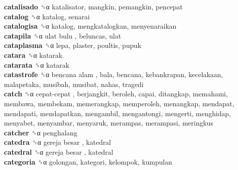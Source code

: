 \textbf{catalisado} ␝α  katalisator, mangkin, pemangkin, pencepat  \\
\textbf{catalog} ␝α  katalog, senarai  \\
\textbf{catalogisa} ␝α  katalog, mengkatalogkan, menyenaraikan  \\
\textbf{catapila} ␝α   ulat bulu , beluncas, ulat  \\
\textbf{cataplasma} ␝α  lepa, plaster, poultis, pupuk  \\
\textbf{catara} ␝α  katarak  \\
\textbf{catarata} ␝α  katarak  \\
\textbf{catastrofe} ␝α   bencana alam , bala, bencana, kebankrapan, kecelakaan, malapetaka, musibah, musibat, nahas, tragedi  \\
\textbf{catch} ␝α   cepat-cepat , berjangkit, beroleh, capai, ditangkap, memahami, membawa, membekam, memerangkap, memperoleh, menangkap, mendapat, mendapati, mendapatkan, mengambil, mengantongi, mengerti, menghidap, menyabet, menyambar, menyaruk, merampas, merampasi, meringkus  \\
\textbf{catcher} ␝α  penghalang  \\
\textbf{catedra} ␝α   gereja besar , katedral  \\
\textbf{catedral} ␝α   gereja besar , katedral  \\
\textbf{categoria} ␝α  golongan, kategori, kelompok, kumpulan  \\

